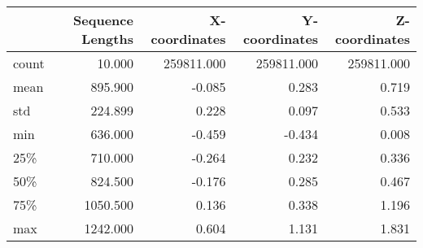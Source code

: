 \begin{tabular}{lrrrr}
\toprule
{} &  Sequence Lengths &  X-coordinates &  Y-coordinates &  Z-coordinates \\
\midrule
count &            10.000 &     259811.000 &     259811.000 &     259811.000 \\
mean  &           895.900 &         -0.085 &          0.283 &          0.719 \\
std   &           224.899 &          0.228 &          0.097 &          0.533 \\
min   &           636.000 &         -0.459 &         -0.434 &          0.008 \\
25\%   &           710.000 &         -0.264 &          0.232 &          0.336 \\
50\%   &           824.500 &         -0.176 &          0.285 &          0.467 \\
75\%   &          1050.500 &          0.136 &          0.338 &          1.196 \\
max   &          1242.000 &          0.604 &          1.131 &          1.831 \\
\bottomrule
\end{tabular}

